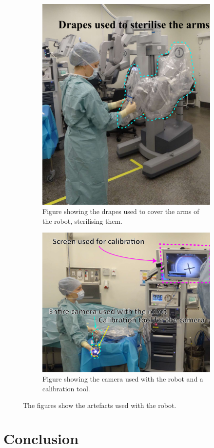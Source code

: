 \documentclass[paper=a4, fontsize=11pt]{scrartcl} %
\numberwithin{equation}{section} %
\numberwithin{figure}{section} %
\numberwithin{table}{section} %
\begin{document}
\begin{figure}[hbpt]
	\centering
	\begin{subfigure}[b]{0.4\textwidth}
		\includegraphics[width=\textwidth]{drapes}
		\caption{Figure showing the drapes used to cover the arms of the robot, sterilising them.}
		\label{fig:drapes}
	\end{subfigure}
	\begin{subfigure}[b]{0.4\textwidth}
		\includegraphics[width=\textwidth]{camera}
		\caption{Figure showing the camera used with the robot and a calibration tool.}
		\label{fig:camera}
	\end{subfigure}
	\caption{The figures show the artefacts used with the robot.}
	\label{fig:artefacts}
\end{figure}
\section{Conclusion}
\end{document}
